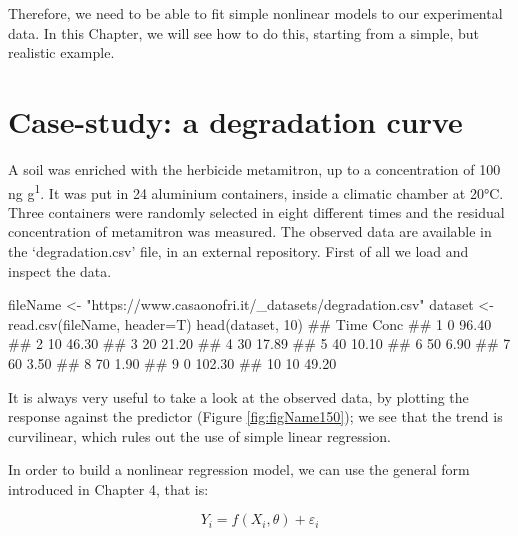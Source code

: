 \documentclass[a4paper,12pt,oneside]{book}
\newenvironment{Shaded}{\begin{snugshade}}{\end{snugshade}}
\newcommand{\DecValTok}[1]{#1}
\newcommand{\StringTok}[1]{#1}
\newcommand{\DocumentationTok}[1]{#1}
\newcommand{\OtherTok}[1]{#1}
\newcommand{\FunctionTok}[1]{#1}
\newcommand{\AttributeTok}[1]{#1}
\newcommand{\NormalTok}[1]{#1}
\begin{document}
Therefore, we need to be able to fit simple nonlinear models to our experimental data. In this Chapter, we will see how to do this, starting from a simple, but realistic example.

\hypertarget{case-study-a-degradation-curve}{%
\section{Case-study: a degradation curve}\label{case-study-a-degradation-curve}}

A soil was enriched with the herbicide metamitron, up to a concentration of 100 ng g\textsuperscript{1}. It was put in 24 aluminium containers, inside a climatic chamber at 20°C. Three containers were randomly selected in eight different times and the residual concentration of metamitron was measured. The observed data are available in the `degradation.csv' file, in an external repository. First of all we load and inspect the data.

\vspace{12pt}

\begin{Shaded}
\begin{Highlighting}[]
\NormalTok{fileName }\OtherTok{\textless{}{-}} \StringTok{"https://www.casaonofri.it/\_datasets/degradation.csv"}
\NormalTok{dataset }\OtherTok{\textless{}{-}} \FunctionTok{read.csv}\NormalTok{(fileName, }\AttributeTok{header=}\NormalTok{T)}
\FunctionTok{head}\NormalTok{(dataset, }\DecValTok{10}\NormalTok{)}
\DocumentationTok{\#\#    Time   Conc}
\DocumentationTok{\#\# 1     0  96.40}
\DocumentationTok{\#\# 2    10  46.30}
\DocumentationTok{\#\# 3    20  21.20}
\DocumentationTok{\#\# 4    30  17.89}
\DocumentationTok{\#\# 5    40  10.10}
\DocumentationTok{\#\# 6    50   6.90}
\DocumentationTok{\#\# 7    60   3.50}
\DocumentationTok{\#\# 8    70   1.90}
\DocumentationTok{\#\# 9     0 102.30}
\DocumentationTok{\#\# 10   10  49.20}
\end{Highlighting}
\end{Shaded}

It is always very useful to take a look at the observed data, by plotting the response against the predictor (Figure \ref{fig:figName150}); we see that the trend is curvilinear, which rules out the use of simple linear regression.

In order to build a nonlinear regression model, we can use the general form introduced in Chapter 4, that is:

\[Y_i = f(X_i, \theta) + \varepsilon_i\]
\end{document}
